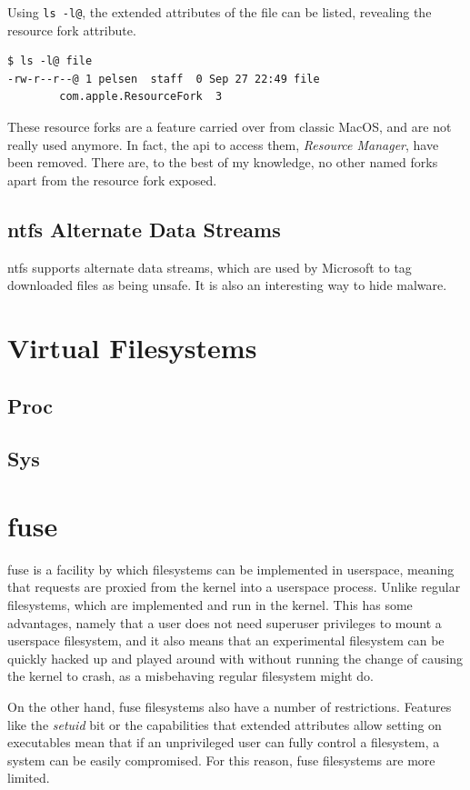 \documentclass[a4paper]{article}
\begin{document}
Using \verb|ls -l@|, the extended attributes of the file can be listed, revealing the resource fork attribute.

\begin{verbatim}
$ ls -l@ file
-rw-r--r--@ 1 pelsen  staff  0 Sep 27 22:49 file
        com.apple.ResourceFork  3  
\end{verbatim}

These resource forks are a feature carried over from classic MacOS, and are not really used anymore. In fact, the \gls{api} to access them, \emph{Resource Manager}, have been removed. There are, to the best of my knowledge, no other named forks apart from the resource fork exposed.

\subsection{\gls{ntfs} Alternate Data Streams}


\gls{ntfs} supports alternate data streams, which are used by Microsoft to tag downloaded files as being unsafe. It is also an interesting way to hide malware.

\section{Virtual Filesystems}

\subsection{Proc}

\subsection{Sys}

\section{\glsdesc*{fuse}}

\gls{fuse} is a facility by which filesystems can be implemented in userspace, meaning that requests are proxied from the kernel into a userspace process. Unlike regular filesystems, which are implemented and run in the kernel. This has some advantages, namely that a user does not need superuser privileges to mount a userspace filesystem, and it also means that an experimental filesystem can be quickly hacked up and played around with without running the change of causing the kernel to crash, as a misbehaving regular filesystem might do. 

On the other hand, \gls{fuse} filesystems also have a number of restrictions. Features like the \emph{setuid} bit or the capabilities that extended attributes allow setting on executables mean that if an unprivileged user can fully control a filesystem, a system can be easily compromised. For this reason, \gls{fuse} filesystems are more limited.

\printglossaries

\printbibliography
\end{document}
